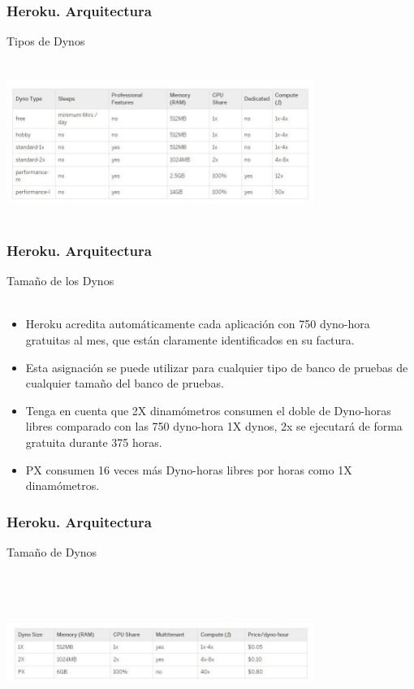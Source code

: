 \documentclass{beamer}
\begin{document}
\begin{frame}
	\frametitle{Heroku. Arquitectura}
	\centering Tipos de Dynos\\ \ \\
	\includegraphics[width=10cm,height=5cm]{arquitectura/dynos.jpg}
	
\end{frame}
\begin{frame}
	\frametitle{Heroku. Arquitectura}
	\centering Tamaño de los Dynos\\ \ \\
	\begin{itemize}
		\item Heroku acredita automáticamente cada aplicación con 750 dyno-hora gratuitas al mes, que están claramente identificados en su factura.
		\item Esta asignación se puede utilizar para cualquier tipo de banco de pruebas de cualquier tamaño del banco de pruebas.
		\item Tenga en cuenta que 2X dinamómetros consumen el doble de Dyno-horas libres comparado con las 750 dyno-hora 1X dynos, 2x se ejecutará de forma gratuita durante 375 horas. 
		\item PX consumen 16 veces más Dyno-horas libres por horas como 1X dinamómetros. 
	\end{itemize}
	
	
\end{frame}
\begin{frame}
	\frametitle{Heroku. Arquitectura}
	\centering Tamaño de Dynos\\ \ \\
	\includegraphics[width=10cm,height=5cm]{arquitectura/dynoshora.jpg}
	
\end{frame}
\end{document}
